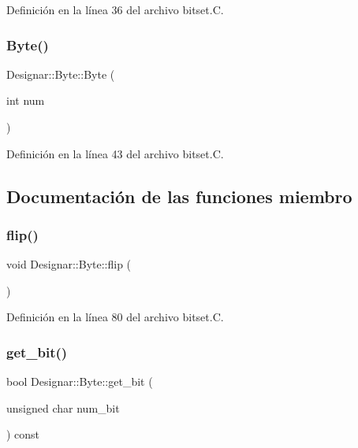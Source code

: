 Definición en la línea 36 del archivo bitset.\+C.

\mbox{\label{class_designar_1_1_byte_a0ca92bbee262c55827eb6b2c1ebaa39e}} 
\subsubsection{\texorpdfstring{Byte()}{Byte()}\hspace{0.1cm}{\footnotesize\ttfamily [3/3]}}
{\footnotesize\ttfamily Designar\+::\+Byte\+::\+Byte (\begin{DoxyParamCaption}\item[{int}]{num }\end{DoxyParamCaption})}



Definición en la línea 43 del archivo bitset.\+C.



\subsection{Documentación de las funciones miembro}
\mbox{\label{class_designar_1_1_byte_abb173606939fe9f5e1c7db0180aba9b0}} 
\subsubsection{\texorpdfstring{flip()}{flip()}}
{\footnotesize\ttfamily void Designar\+::\+Byte\+::flip (\begin{DoxyParamCaption}{ }\end{DoxyParamCaption})}



Definición en la línea 80 del archivo bitset.\+C.

\mbox{\label{class_designar_1_1_byte_a9f14a28a82353d48a802000c6de20c8e}} 
\subsubsection{\texorpdfstring{get\+\_\+bit()}{get\_bit()}}
{\footnotesize\ttfamily bool Designar\+::\+Byte\+::get\+\_\+bit (\begin{DoxyParamCaption}\item[{unsigned char}]{num\+\_\+bit }\end{DoxyParamCaption}) const}



